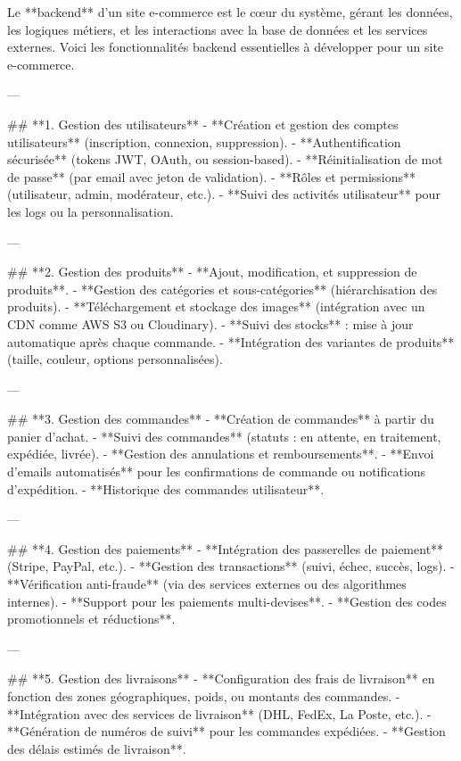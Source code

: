 Le **backend** d’un site e-commerce est le cœur du système, gérant les données, les logiques métiers, et les interactions avec la base de données et les services externes. Voici les fonctionnalités backend essentielles à développer pour un site e-commerce.

---

## **1. Gestion des utilisateurs**
- **Création et gestion des comptes utilisateurs** (inscription, connexion, suppression).
- **Authentification sécurisée** (tokens JWT, OAuth, ou session-based).
- **Réinitialisation de mot de passe** (par email avec jeton de validation).
- **Rôles et permissions** (utilisateur, admin, modérateur, etc.).
- **Suivi des activités utilisateur** pour les logs ou la personnalisation.

---

## **2. Gestion des produits**
- **Ajout, modification, et suppression de produits**.
- **Gestion des catégories et sous-catégories** (hiérarchisation des produits).
- **Téléchargement et stockage des images** (intégration avec un CDN comme AWS S3 ou Cloudinary).
- **Suivi des stocks** : mise à jour automatique après chaque commande.
- **Intégration des variantes de produits** (taille, couleur, options personnalisées).

---

## **3. Gestion des commandes**
- **Création de commandes** à partir du panier d'achat.
- **Suivi des commandes** (statuts : en attente, en traitement, expédiée, livrée).
- **Gestion des annulations et remboursements**.
- **Envoi d'emails automatisés** pour les confirmations de commande ou notifications d’expédition.
- **Historique des commandes utilisateur**.

---

## **4. Gestion des paiements**
- **Intégration des passerelles de paiement** (Stripe, PayPal, etc.).
- **Gestion des transactions** (suivi, échec, succès, logs).
- **Vérification anti-fraude** (via des services externes ou des algorithmes internes).
- **Support pour les paiements multi-devises**.
- **Gestion des codes promotionnels et réductions**.

---

## **5. Gestion des livraisons**
- **Configuration des frais de livraison** en fonction des zones géographiques, poids, ou montants des commandes.
- **Intégration avec des services de livraison** (DHL, FedEx, La Poste, etc.).
- **Génération de numéros de suivi** pour les commandes expédiées.
- **Gestion des délais estimés de livraison**.

